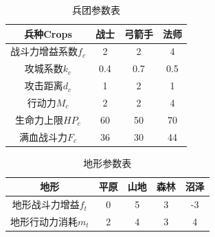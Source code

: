 \documentclass[a4paper,4pt]{article}
\begin{document}
\begin{table}[htbp]
	\centering
	\caption{兵团参数表}
	\begin{tabular}{c|c|c|c}
		\hline
		兵种Crops           & 战士 & 弓箭手 & 法师 \bigstrut \\
		\hline
		战斗力增益系数$f_c$ & 2    & 2      & 4 \bigstrut    \\
		\hline
		攻城系数$k_c$       & 0.4  & 0.7    & 0.5 \bigstrut  \\
		\hline
		攻击距离$d_c$       & 1    & 2      & 1 \bigstrut    \\
		\hline
		行动力$M_c$         & 2    & 2      & 4 \bigstrut    \\
		\hline
		生命力上限$HP_c$    & 60   & 50     & 70 \bigstrut   \\
		\hline
		满血战斗力$F_c$     & 36   & 30     & 44 \bigstrut   \\
		\hline
	\end{tabular}%
	\label{兵团}%
\end{table}%

\begin{table}[htbp]
	\centering
	\caption{地形参数表}
	\begin{tabular}{c|c|c|c|c|}
		\hline
		地形                & 平原 & 山地 & 森林 & 沼泽 \bigstrut \\
		\hline
		地形战斗力增益$f_t$ & 0    & 5    & 3    & -3 \bigstrut   \\
		\hline
		地形行动力消耗$m_t$ & 2    & 4    & 3    & 4 \bigstrut    \\
		\hline
	\end{tabular}%
	\label{地形}%
\end{table}%
\end{document}
